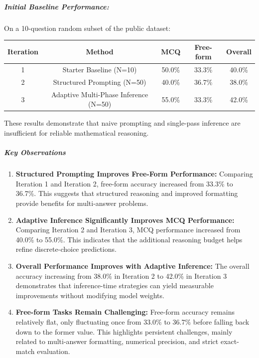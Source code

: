 \documentclass{article}
\begin{document}
\subparagraph{Initial Baseline Performance:} On a 10-question random subset of the public dataset:
\begin{center}
    \def\arraystretch{2.0}
    \begin{tabular}{||c c c c c||}
        \hline
        \textbf{Iteration} & \textbf{Method} & \textbf{MCQ} & \textbf{Free-form} & \textbf{Overall}\\
        \hline
         1 & Starter Baseline (N=10) & 50.0\% & 33.3\% & 40.0\% \\
        \hline
         2 & Structured Prompting (N=50) & 40.0\% & 36.7\% & 38.0\% \\
        \hline
         3 & Adaptive Multi-Phase Inference (N=50) & 55.0\% & 33.3\% & 42.0\% \\
        \hline
    \end{tabular}
\end{center}

These results demonstrate that naive prompting and single-pass inference are insufficient for reliable mathematical reasoning.
\subparagraph{Key Observations}
\begin{enumerate}
    \item \textbf{Structured Prompting Improves Free-Form Performance:} Comparing Iteration 1 and Iteration 2, free-form accuracy increased from 33.3\% to 36.7\%. This suggests that structured reasoning and improved formatting provide benefits for multi-answer problems.
    \item \textbf{Adaptive Inference Significantly Improves MCQ Performance:} Comparing Iteration 2 and Iteration 3, MCQ performance increased from 40.0\% to 55.0\%. This indicates that the additional reasoning budget helps refine discrete-choice predictions.
    \item \textbf{Overall Performance Improves with Adaptive Inference:} The overall accuracy increasing from 38.0\% in Iteration 2 to 42.0\% in Iteration 3 demonstrates that inference-time strategies can yield measurable improvements without modifying model weights.
    \item \textbf{Free-form Tasks Remain Challenging:} Free-form accuracy remains relatively flat, only fluctuating once from 33.0\% to 36.7\% before falling back down to the former value. This highlights persistent challenges, mainly related to multi-answer formatting, numerical precision, and strict exact-match evaluation.
\end{enumerate}
\end{document}
